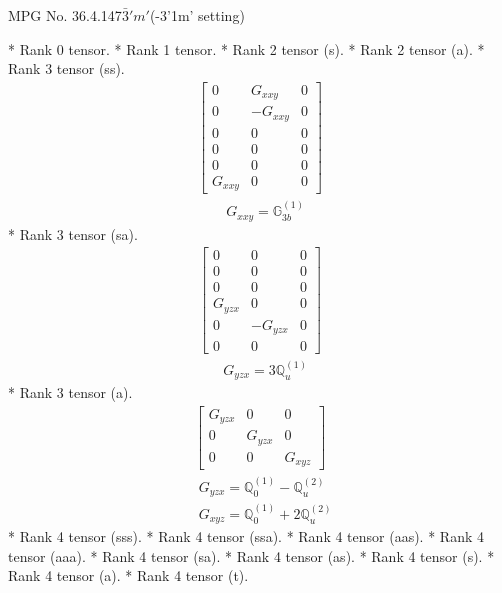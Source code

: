 \documentclass[fleqn,8pt,landscape]{jsarticle}
\begin{document}
\setcounter{MaxMatrixCols}{32}

\renewcommand{\tablename}{Table~}
\renewcommand{\figurename}{Figure~}
\begin{center}
\LARGE
MPG No. 36.4.147\quad$\bar{3}'m'$\quad(-3'1m' setting)
\end{center}
* Rank 0 tensor.
* Rank 1 tensor.
* Rank 2 tensor (s).
* Rank 2 tensor (a).
* Rank 3 tensor (ss).
\begin{align*}
\begin{bmatrix} 0 & G_{xxy} & 0 \\ 0 & - G_{xxy} & 0 \\ 0 & 0 & 0 \\ 0 & 0 & 0 \\ 0 & 0 & 0 \\ G_{xxy} & 0 & 0 \end{bmatrix}
\end{align*}
\begin{align*}
& G_{xxy} = \mathbb{G}_{3b}^{(1)}
\end{align*}
* Rank 3 tensor (sa).
\begin{align*}
\begin{bmatrix} 0 & 0 & 0 \\ 0 & 0 & 0 \\ 0 & 0 & 0 \\ G_{yzx} & 0 & 0 \\ 0 & - G_{yzx} & 0 \\ 0 & 0 & 0 \end{bmatrix}
\end{align*}
\begin{align*}
& G_{yzx} = 3 \mathbb{Q}_{u}^{(1)}
\end{align*}
* Rank 3 tensor (a).
\begin{align*}
\begin{bmatrix} G_{yzx} & 0 & 0 \\ 0 & G_{yzx} & 0 \\ 0 & 0 & G_{xyz} \end{bmatrix}
\end{align*}
\begin{align*}
& G_{yzx} = \mathbb{Q}_{0}^{(1)} - \mathbb{Q}_{u}^{(2)} \\
& G_{xyz} = \mathbb{Q}_{0}^{(1)} + 2 \mathbb{Q}_{u}^{(2)}
\end{align*}
* Rank 4 tensor (sss).
* Rank 4 tensor (ssa).
* Rank 4 tensor (aas).
* Rank 4 tensor (aaa).
* Rank 4 tensor (sa).
* Rank 4 tensor (as).
* Rank 4 tensor (s).
* Rank 4 tensor (a).
* Rank 4 tensor (t).
\end{document}
